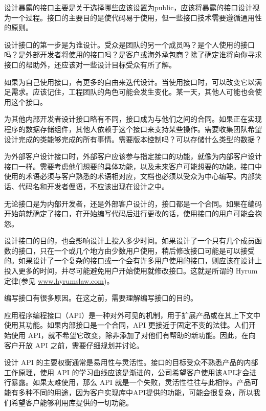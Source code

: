 设计暴露的接口主要是关于选择哪些应该设置为public，应该将暴露的接口设计视为一个过程。接口的主要目的是使代码易于使用，但一些接口技术需要遵循通用性的原则。


设计接口的第一步是为谁设计。受众是团队的另一个成员吗？是个人使用的接口吗？是外部开发者将使用的接口吗？是客户或海外承包商？除了确定谁将向你寻求接口的帮助外，还应该对一些设计目标受众有所了解。

如果为自己使用接口，有更多的自由来迭代设计。当使用接口时，可以改变它以满足需求。应该记住，工程团队的角色可能会发生变化。某一天，其他人可能也会使用这个接口。

为其他内部开发者设计接口略有不同，接口成为与他们之间的合同。如果正在实现程序的数据存储组件，其他人依赖于这个接口来支持某些操作。需要收集团队希望设计完成的类能够完成的所有事情。需要版本控制吗？可以存储什么类型的数据？

为外部客户设计接口时，外部客户应该参与指定接口的功能，就像为内部客户设计接口一样。需要考虑他们想要的具体功能，以及未来客户可能想要的功能。接口中使用的术语必须与客户熟悉的术语相对应，文档也必须以受众为中心编写。内部笑话、代码名和开发者俚语，不应该出现在设计之中。

无论接口是为内部开发者，还是外部客户设计的，接口都是一个合同。如果在编码开始前就确定了接口，在开始编写代码后进行更改的话，使用接口的用户可能会抱怨。

设计接口的目的，也会影响设计上投入多少时间。如果设计了一个只有几个成员函数的接口，只在一个或几个地方由少数用户使用，稍后修改接口可能是可以接受的。如果设计了一个复杂的接口或一个会有许多用户使用的接口，则应该在设计上投入更多的时间，并尽可能避免用户开始使用就修改接口。这就是所谓的 Hyrum 定律(参见 \url{www.hyrumslaw.com})。


编写接口有很多原因。在这之前，需要理解编写接口的目的。


应用程序编程接口（API）是一种对外可见的机制，用于扩展产品或在其上下文中使用其功能。如果内部接口是一个合同，API 更接近于固定不变的法律。人们开始使用 API，就不希望它改变，除非添加了对他们有帮助的新功能。因此，在向客户开放 API 之前，需要仔细规划并讨论。

设计 API 的主要权衡通常是易用性与灵活性。接口的目标受众不熟悉产品的内部工作原理，使用 API 的学习曲线应该是渐进的，公司希望客户使用该API才会进行暴露。如果太难使用，那么 API 就是一个失败，灵活性往往与此相悖。产品可能有多种不同的用途，因为客户实现库中API提供的功能，可能会很复杂，所以我们希望客户能够利用库提供的一切功能。

